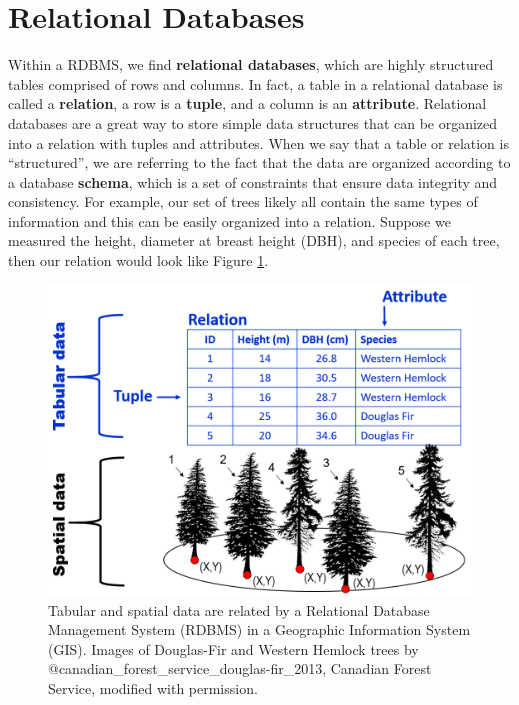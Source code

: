 \documentclass[
]{book}
\begin{document}
\hypertarget{relational-databases-1}{%
\section{Relational Databases}\label{relational-databases-1}}

Within a RDBMS, we find \textbf{relational databases}, which are highly structured tables comprised of rows and columns. In fact, a table in a relational database is called a \textbf{relation}, a row is a \textbf{tuple}, and a column is an \textbf{attribute}. Relational databases are a great way to store simple data structures that can be organized into a relation with tuples and attributes. When we say that a table or relation is ``structured'', we are referring to the fact that the data are organized according to a database \textbf{schema}, which is a set of constraints that ensure data integrity and consistency. For example, our set of trees likely all contain the same types of information and this can be easily organized into a relation. Suppose we measured the height, diameter at breast height (DBH), and species of each tree, then our relation would look like Figure \ref{fig:5-tabular-data-spatial-data}.

\begin{figure}
\includegraphics[width=0.75\linewidth]{images/05-tabular-data-spatial-data} \caption{Tabular and spatial data are related by a Relational Database Management System (RDBMS) in a Geographic Information System (GIS). Images of Douglas-Fir and Western Hemlock trees by @canadian_forest_service_douglas-fir_2013, Canadian Forest Service, modified with permission.}\label{fig:5-tabular-data-spatial-data}
\end{figure}
\end{document}
